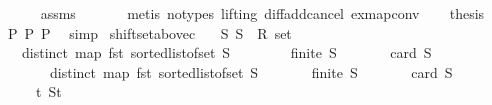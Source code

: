 \begin{isabellebody}
\ \ \ \ \isamarkupfalse%
\ assms{\isacharparenleft}{\kern0pt}{}{\isacharparenright}{\kern0pt}\ {}\isanewline
\ \ \ \ \isamarkupfalse%
\ {\isacharparenleft}{\kern0pt}metis\ {\isacharparenleft}{\kern0pt}no{\isacharunderscore}{\kern0pt}types{\isacharcomma}{\kern0pt}\ lifting{\isacharparenright}{\kern0pt}\ diff{\isacharunderscore}{\kern0pt}add{\isacharunderscore}{\kern0pt}cancel\ ex{\isacharunderscore}{\kern0pt}map{\isacharunderscore}{\kern0pt}conv{\isacharparenright}{\kern0pt}\isanewline
\isanewline
\ \ \isamarkupfalse%
\ {\isacharquery}{\kern0pt}thesis\ \isamarkupfalse%
\ P{}\ P{}\ P{}\ \isamarkupfalse%
\ simp\isanewline
{}\isamarkupfalse%
%
\endisatagproof
{\isafoldproof}%
%
\isadelimproof
\isanewline
%
\endisadelimproof
\isanewline
\isanewline
{}\isamarkupfalse%
\ shift{\isacharunderscore}{\kern0pt}set{\isacharunderscore}{\kern0pt}above{\isacharunderscore}{\kern0pt}c{}{\isacharcolon}{\kern0pt}\isanewline
\ \ \ S{}\ S{}\ {\isacharcolon}{\kern0pt}{\isacharcolon}{\kern0pt}\ {\isachardoublequoteopen}R{}\ set{\isachardoublequoteclose}\isanewline
\isanewline
\ \ \ {\isachardoublequoteopen}distinct\ {\isacharparenleft}{\kern0pt}map\ fst\ {\isacharparenleft}{\kern0pt}sorted{\isacharunderscore}{\kern0pt}list{\isacharunderscore}{\kern0pt}of{\isacharunderscore}{\kern0pt}set\ S{}{\isacharparenright}{\kern0pt}{\isacharparenright}{\kern0pt}{\isachardoublequoteclose}\ \isanewline
\ \ \ \ \ \ \ {\isachardoublequoteopen}finite\ S{}{\isachardoublequoteclose}\isanewline
\ \ \ \ \ \ \ {\isachardoublequoteopen}card\ S{}\ {\isasymge}\ {}{\isachardoublequoteclose}\isanewline
\isanewline
\ \ \ \ \ \ \ {\isachardoublequoteopen}distinct\ {\isacharparenleft}{\kern0pt}map\ fst\ {\isacharparenleft}{\kern0pt}sorted{\isacharunderscore}{\kern0pt}list{\isacharunderscore}{\kern0pt}of{\isacharunderscore}{\kern0pt}set\ S{}{\isacharparenright}{\kern0pt}{\isacharparenright}{\kern0pt}{\isachardoublequoteclose}\isanewline
\ \ \ \ \ \ \ {\isachardoublequoteopen}finite\ S{}{\isachardoublequoteclose}\isanewline
\ \ \ \ \ \ \ {\isachardoublequoteopen}card\ S{}\ {\isasymge}\ {}{\isachardoublequoteclose}\isanewline
\isanewline
\ \ \ \ \ {\isachardoublequoteopen}{\isasymexists}t{\isachardot}{\kern0pt}\ {\isasymexists}S{}t{\isachardot}{\kern0pt}\isanewline

\end{isabellebody}
